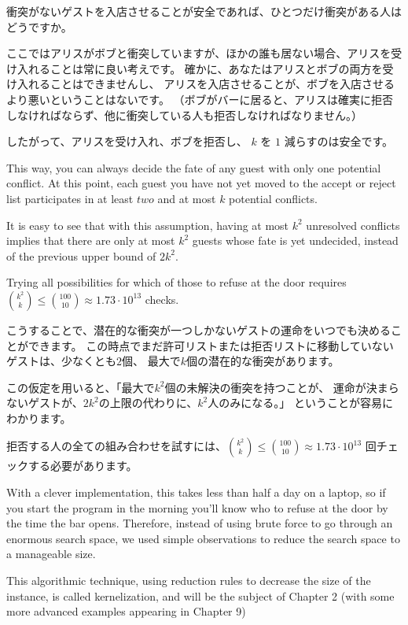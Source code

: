\documentclass{jsarticle}
\begin{document}
衝突がないゲストを入店させることが安全であれば、ひとつだけ衝突がある人はどうですか。

ここではアリスがボブと衝突していますが、ほかの誰も居ない場合、アリスを受け入れることは常に良い考えです。
確かに、あなたはアリスとボブの両方を受け入れることはできませんし、
アリスを入店させることが、ボブを入店させるより悪いということはないです。
（ボブがバーに居ると、アリスは確実に拒否しなければならず、他に衝突している人も拒否しなければなりません。）

したがって、アリスを受け入れ、ボブを拒否し、 $k$ を $1$ 減らすのは安全です。


\begin{screen}
           
This way, you can always decide the fate of any guest with only one potential conflict. 
At this point, each guest you have not yet moved to the accept or reject list participates 
in at least $two$ and at most $k$ potential conflicts. 

It is easy to see that with this assumption,
 having at most $k^2$ unresolved conflicts implies that 
 there are only at most $k^2$ guests whose fate is yet undecided,
  instead of the previous upper bound of $2k^2$. 

Trying all possibilities for which of those to refuse at the door requires
$\binom{k^2}{k} \leq \binom{100}{10} \approx 1.73 \cdot 10^{13}$ checks.
\end{screen}

こうすることで、潜在的な衝突が一つしかないゲストの運命をいつでも決めることができます。
この時点でまだ許可リストまたは拒否リストに移動していないゲストは、少なくとも$2$個、
最大で$k$個の潜在的な衝突があります。

この仮定を用いると、「最大で$k^2$個の未解決の衝突を持つことが、
運命が決まらないゲストが、$2k^2$の上限の代わりに、$k^2$人のみになる。」
ということが容易にわかります。

拒否する人の全ての組み合わせを試すには、$\binom{k^2}{k} \leq \binom{100}{10} \approx 1.73 \cdot 10^{13}$ 回チェックする必要があります。
\newpage

\begin{screen}
    With a clever implementation, 
    this takes less than half a day on a laptop, 
    so if you start the program in the morning you’ll know who to refuse at the door by the time the bar opens. 
    Therefore, instead of using brute force to go through an enormous search space,
     we used simple observations to reduce the search space to a manageable size. 
    
    This algorithmic technique, using reduction rules to decrease the size of the instance, is called kernelization,
    and will be the subject of Chapter 2 (with some more advanced examples appearing in Chapter 9)
        
\end{screen}
\end{document}

